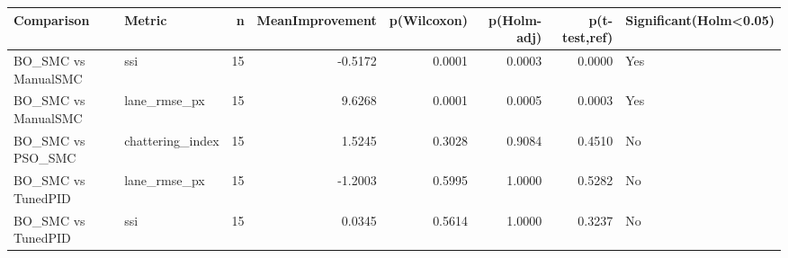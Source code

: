 \begin{tabular}{llrrrrrl}
\toprule
Comparison & Metric & n & MeanImprovement & p(Wilcoxon) & p(Holm-adj) & p(t-test,ref) & Significant(Holm<0.05) \\
\midrule
BO_SMC vs ManualSMC & ssi & 15 & -0.5172 & 0.0001 & 0.0003 & 0.0000 & Yes \\
BO_SMC vs ManualSMC & lane_rmse_px & 15 & 9.6268 & 0.0001 & 0.0005 & 0.0003 & Yes \\
BO_SMC vs PSO_SMC & chattering_index & 15 & 1.5245 & 0.3028 & 0.9084 & 0.4510 & No \\
BO_SMC vs TunedPID & lane_rmse_px & 15 & -1.2003 & 0.5995 & 1.0000 & 0.5282 & No \\
BO_SMC vs TunedPID & ssi & 15 & 0.0345 & 0.5614 & 1.0000 & 0.3237 & No \\
\bottomrule
\end{tabular}
